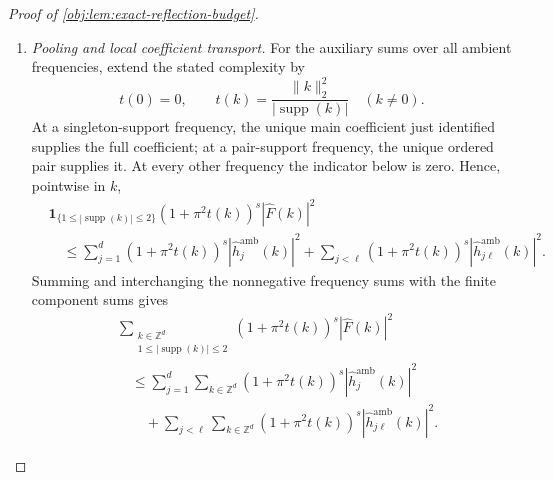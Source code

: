 \documentclass[11pt]{article}
\begin{document}
\begin{proof}[Proof of \cref{obj:lem:exact-reflection-budget}]
\begin{enumerate}
\item \textit{Pooling and local coefficient transport.}
For the auxiliary sums over all ambient frequencies, extend the stated complexity by
\[
t(0)=0,
\qquad
t(k)=\frac{\|k\|_2^2}{|\operatorname{supp}(k)|}
\quad(k\neq0).
\]
At a singleton-support frequency, the unique main coefficient just identified supplies the full coefficient; at a pair-support frequency, the unique ordered pair supplies it. At every other frequency the indicator below is zero. Hence, pointwise in \(k\),
\[
\begin{aligned}
&\mathbf1_{\{1\leq|\operatorname{supp}(k)|\leq2\}}
(1+\pi^2t(k))^s|\widehat F(k)|^2\\
&\quad\leq
\sum_{j=1}^d
(1+\pi^2t(k))^s|\widehat h_j^{\mathrm{amb}}(k)|^2
+
\sum_{j<\ell}
(1+\pi^2t(k))^s|\widehat h_{j\ell}^{\mathrm{amb}}(k)|^2.
\end{aligned}
\]
Summing and interchanging the nonnegative frequency sums with the finite component sums gives
\[
\begin{aligned}
&\sum_{\substack{k\in\mathbb Z^d\\1\leq|\operatorname{supp}(k)|\leq2}}
(1+\pi^2t(k))^s|\widehat F(k)|^2\\
&\quad\leq
\sum_{j=1}^d\sum_{k\in\mathbb Z^d}
(1+\pi^2t(k))^s|\widehat h_j^{\mathrm{amb}}(k)|^2\\
&\qquad+
\sum_{j<\ell}\sum_{k\in\mathbb Z^d}
(1+\pi^2t(k))^s|\widehat h_{j\ell}^{\mathrm{amb}}(k)|^2.
\end{aligned}
\]


\end{enumerate}
\end{proof}
\end{document}
